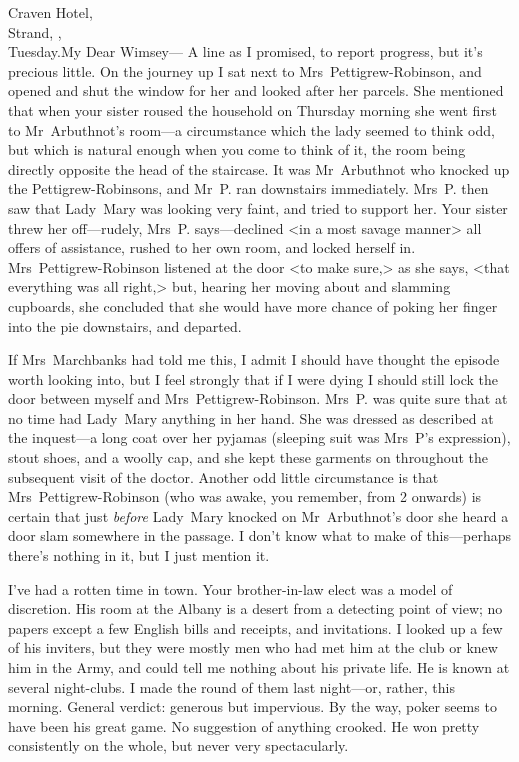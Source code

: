 \begin{mail}{Craven Hotel,\\Strand, ,\\Tuesday.}{My Dear Wimsey---}
	A line as I promised, to report progress, but it's precious little. On the journey up I sat next to Mrs~Pettigrew-Robinson, and opened and shut the window for her and looked after her parcels. She mentioned that when your sister roused the household on Thursday morning she went first to Mr~Arbuthnot's room—a circumstance which the lady seemed to think odd, but which is natural enough when you come to think of it, the room being directly opposite the head of the staircase. It was Mr~Arbuthnot who knocked up the Pettigrew-Robinsons, and Mr~P\@. ran downstairs immediately.  Mrs~P\@. then saw that Lady~Mary was looking very faint, and tried to support her. Your sister threw her off—rudely, Mrs~P\@. says—declined <in a most savage manner> all offers of assistance, rushed to her own room, and locked herself in. Mrs~Pettigrew-Robinson listened at the door <to make sure,> as she says, <that everything was all right,> but, hearing her moving about and slamming cupboards, she concluded that she would have more chance of poking her finger into the pie downstairs, and departed.

If Mrs~Marchbanks had told me this, I admit I should have thought the episode worth looking into, but I feel strongly that if I were dying I should still lock the door between myself and Mrs~Pettigrew-Robinson.  Mrs~P\@. was quite sure that at no time had Lady~Mary anything in her hand. She was dressed as described at the inquest—a long coat over her pyjamas (sleeping suit was Mrs~P's expression), stout shoes, and a woolly cap, and she kept these garments on throughout the subsequent visit of the doctor. Another odd little circumstance is that Mrs~Pettigrew-Robinson (who was awake, you remember, from 2  onwards) is certain that just \textit{before} Lady~Mary knocked on Mr~Arbuthnot's door she heard a door slam somewhere in the passage. I don't know what to make of this—perhaps there's nothing in it, but I just mention it.

I've had a rotten time in town. Your brother-in-law elect was a model of discretion. His room at the Albany is a desert from a detecting point of view; no papers except a few English bills and receipts, and invitations. I looked up a few of his inviters, but they were mostly men who had met him at the club or knew him in the Army, and could tell me nothing about his private life. He is known at several night-clubs. I made the round of them last night—or, rather, this morning. General verdict: generous but impervious. By the way, poker seems to have been his great game. No suggestion of anything crooked.  He won pretty consistently on the whole, but never very spectacularly.


\end{mail}
